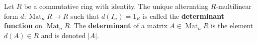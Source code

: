 Let $R$ be a commutative ring with identity. The unique alternating $R$-multilinear form $d : \operatorname{Mat}_n R \to R$ such that $d(I_n) = 1_R$ is called the \textbf{determinant function} on $\operatorname{Mat}_n R$. The \textbf{determinant} of a matrix $A \in \operatorname{Mat}_n R$ is the element $d(A) \in R$ and is denoted $|A|$.

